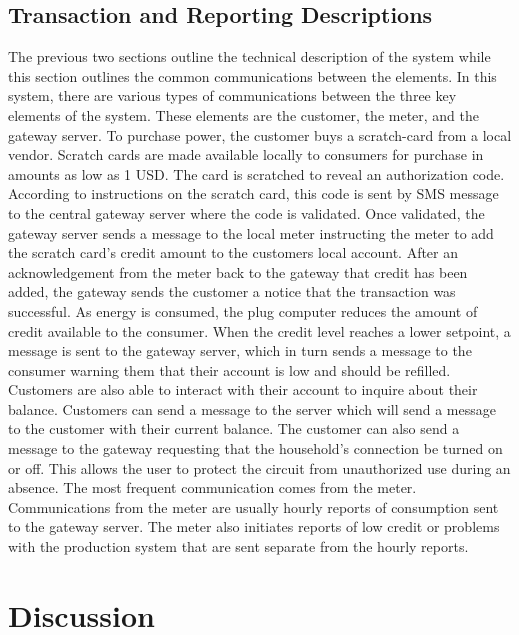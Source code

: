 \documentclass[conference]{IEEEtran}
\begin{document}
\subsection{Transaction and Reporting Descriptions}
The previous two sections outline the technical description of the system
while this section outlines the common communications between the elements.
In this system, there are various types of communications between the 
three key elements of the system.  These elements are the customer, the 
meter, and the gateway server.
To purchase power, the customer buys a scratch-card from a local vendor.
Scratch cards are made available locally
to consumers for purchase in amounts as low as 1 USD.  
The card is scratched to reveal an authorization code.  
According to instructions on the scratch card, this code is sent by
SMS message to the central gateway server where the code is validated.  
Once validated, the gateway server sends a message to the local meter
instructing the meter to add the scratch card's credit amount to the 
customers local account.
After an acknowledgement from the meter back to the gateway that credit
has been added, the gateway sends the customer a notice that the transaction
was successful.
As energy is consumed, the plug computer reduces the amount of credit
available to the consumer.  
When the credit level reaches a lower setpoint, a message is sent
to the gateway server, which in turn sends a message to the consumer warning them
that their account is low and should be refilled.  
Customers are also able to interact with their account to inquire about their 
balance.  Customers can send a message to the server which will send a message
to the customer with their current balance.  
The customer can also send a message to the gateway requesting that the household's 
connection be turned on or off.  This allows the user to protect the circuit 
from unauthorized use during an absence.
The most frequent communication comes from the meter.  
Communications from the meter are usually hourly reports of consumption
sent to the gateway server.  The meter also initiates reports of low
credit or problems with the production system that are sent separate from
the hourly reports.

\section{Discussion}
\end{document}
